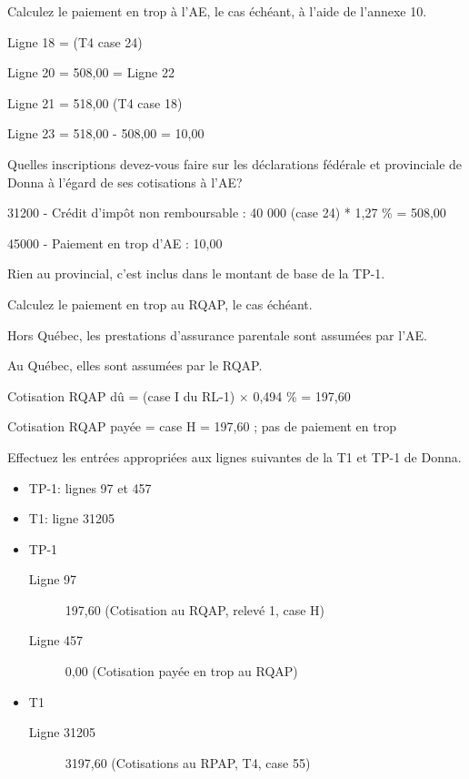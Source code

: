 \begin{question}
	Calculez le paiement en trop à l'AE, le cas échéant, à l'aide de l'annexe 10.
\end{question}
Ligne 18 =  (T4 case 24)

Ligne 20 = 508,00 = Ligne 22

Ligne 21 =  518,00 (T4 case 18)

Ligne 23 = 518,00 - 508,00 = 10,00

\begin{question}
	Quelles inscriptions devez-vous faire sur les déclarations fédérale et provinciale de Donna à l'égard de ses cotisations à l'AE?
\end{question}
31200 - Crédit d'impôt non remboursable : 40 000 (case 24) * 1,27 \% = 508,00

45000 - Paiement en trop d'AE : 10,00

Rien au provincial, c'est inclus dans le montant de base de la TP-1.

\begin{question}
	Calculez le paiement en trop au RQAP, le cas échéant.
\end{question}
Hors Québec, les prestations d'assurance parentale sont assumées par l'AE.

Au Québec, elles sont assumées par le RQAP.

Cotisation RQAP dû =  (case I du RL-1) $\times$ 0,494 \% = 197,60

Cotisation RQAP payée = case H = 197,60 ; pas de paiement en trop

\begin{question}
	Effectuez les entrées appropriées aux lignes suivantes de la T1 et TP-1 de Donna.
	\begin{itemize}
		\item TP-1: lignes 97 et 457
		\item T1: ligne 31205
	\end{itemize}
\end{question}
\begin{itemize}
	\item TP-1
	\begin{description}
		\item[Ligne 97] 197,60 (Cotisation au RQAP, relevé 1, case H)
		\item[Ligne 457] 0,00 (Cotisation payée en trop au RQAP)
	\end{description}
	\item T1
	\begin{description}
		\item[Ligne 31205] 3197,60 (Cotisations au RPAP, T4, case 55)
	\end{description}
\end{itemize}


